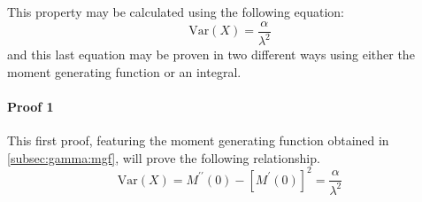 \documentclass[12pt]{article}
\begin{document}
This property may be calculated using the following equation:
\begin{equation}\label{eq:gamma:var}
	\text{Var}(X) = \frac{\alpha}{\lambda^2}
\end{equation}
and this last equation may be proven in two different ways using either the moment generating function or an integral.

\paragraph{Proof 1}
This first proof, featuring the moment generating function obtained in \autoref{subsec:gamma:mgf}, will prove the
following relationship.
\begin{equation}\label{eq:gamma:var:proof1}
	\text{Var}(X) = M^{\prime\prime}(0) - [M^\prime(0)]^2 = \frac{\alpha}{\lambda^2}
\end{equation}
\end{document}
